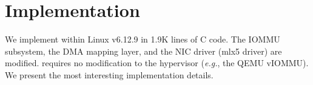 \section{Implementation}
\label{sec:impl}

We implement \brand within Linux v6.12.9 in 1.9K lines of C code. 
The IOMMU subsystem, the DMA mapping layer, and the NIC driver (mlx5 driver)
    are modified.
\brand requires no modification to the hypervisor 
    (\textit{e.g.}, the QEMU vIOMMU).
We present the most interesting implementation details. 


\subsection{\optOneHeading}




